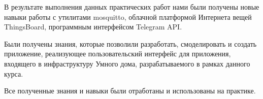 \documentclass[a4paper,14pt]{extarticle}
\begin{document}
\newpage
{}

В результате выполнения данных практических работ нами были получены новые навыки работы с утилитами mosquitto, облачной платформой Интернета вещей ThingsBoard, программным интерфейсом Telegram API. 

Были получены знания, которые позволили разработать, смоделировать и создать приложение, реализующее пользовательский интерфейс для приложения, входящего в инфраструктуру Умного дома, разрабатываемого в рамках данного курса.


Все полученные знания и навыки были отработаны и использованы на практике.
\end{document}
